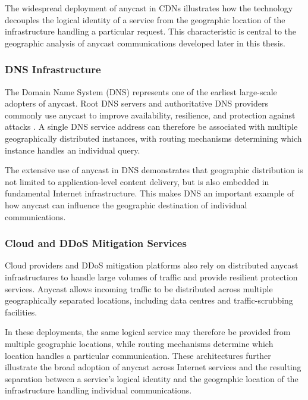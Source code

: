 \documentclass[
A4paper,                %
twoside,                %
openright,              %
chapterprefix=true,     %
12pt,                   %
headings=normal,        %
titlepage=on            %
]{book}
\begin{document}
The widespread deployment of anycast in CDNs illustrates how the technology decouples the logical identity of a service from the geographic location of the infrastructure handling a particular request. This characteristic is central to the geographic analysis of anycast communications developed later in this thesis.

\subsubsection{DNS Infrastructure}
\label{sc:background_internet_routing_anycast_modern_dns}

The Domain Name System (DNS) represents one of the earliest large-scale adopters of anycast. Root DNS servers and authoritative DNS providers commonly use anycast to improve availability, resilience, and protection against attacks \cite{Abley2006OperationServices}. A single DNS service address can therefore be associated with multiple geographically distributed instances, with routing mechanisms determining which instance handles an individual query.

The extensive use of anycast in DNS demonstrates that geographic distribution is not limited to application-level content delivery, but is also embedded in fundamental Internet infrastructure. This makes DNS an important example of how anycast can influence the geographic destination of individual communications.

\subsubsection{Cloud and DDoS Mitigation Services}
\label{sc:background_internet_routing_anycast_modern_ddos}

Cloud providers and DDoS mitigation platforms also rely on distributed anycast infrastructures to handle large volumes of traffic and provide resilient protection services. Anycast allows incoming traffic to be distributed across multiple geographically separated locations, including data centres and traffic-scrubbing facilities.

In these deployments, the same logical service may therefore be provided from multiple geographic locations, while routing mechanisms determine which location handles a particular communication. These architectures further illustrate the broad adoption of anycast across Internet services and the resulting separation between a service's logical identity and the geographic location of the infrastructure handling individual communications.
\end{document}

